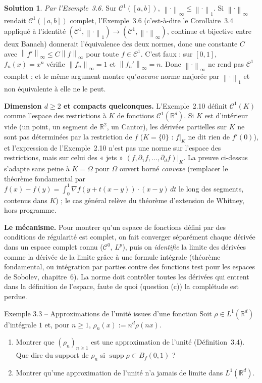 \documentclass[11pt,a4paper]{article}
\newcommand{\R}{\mathbb{R}}
\newcommand{\adh}[1]{\overline{#1}}
\newcommand{\Bf}{B_f}
\newcommand{\norm}[1]{\left\|#1\right\|}
\newcommand{\Cz}{\mathcal{C}^0}
\newcommand{\ie}{c'est-à-dire}
\DeclareMathOperator{\supp}{supp}
\theoremstyle{definition}
\newtheorem*{solution}{Solution}
\begin{document}
\begin{solution}
\emph{Par l'Exemple~3.6.} Sur $\mathcal C^1([a,b])$, $\norm\cdot_\infty\le\norm\cdot_1$. Si $\norm\cdot_\infty$ rendait $\mathcal C^1([a,b])$ complet, l'Exemple~3.6 (\ie{} le Corollaire~3.4 appliqué à l'identité $(\mathcal C^1,\norm\cdot_1)\to(\mathcal C^1,\norm\cdot_\infty)$, continue et bijective entre deux Banach) donnerait l'équivalence des deux normes, donc une constante $C$ avec $\norm{f'}_\infty\le C\norm f_\infty$ pour toute $f\in\mathcal C^1$. C'est faux : sur $[0,1]$, $f_n(x)=x^n$ vérifie $\norm{f_n}_\infty=1$ et $\norm{f_n'}_\infty=n$. Donc $\norm\cdot_\infty$ ne rend pas $\mathcal C^1$ complet ; et le même argument montre qu'\emph{aucune} norme majorée par $\norm\cdot_1$ et non équivalente à elle ne le peut.
\end{solution}

\begin{piege}
\textbf{Dimension $d\ge2$ et compacts quelconques.} L'Exemple~2.10 définit $\mathcal C^1(K)$ comme l'espace des restrictions à $K$ de fonctions $\mathcal C^1(\R^d)$. Si $K$ est d'intérieur vide (un point, un segment de $\R^2$, un Cantor), les dérivées partielles sur $K$ ne sont pas déterminées par la restriction de $f$ ($K=\{0\}$ : $f|_K$ ne dit rien de $f'(0)$), et l'expression de l'Exemple~2.10 n'est pas une norme sur l'espace des restrictions, mais sur celui des « jets » $(f,\partial_1f,\dots,\partial_df)|_K$. La preuve ci-dessus s'adapte sans peine à $K=\adh\Omega$ pour $\Omega$ ouvert borné \emph{convexe} (remplacer le théorème fondamental par $f(x)-f(y)=\int_0^1\nabla f(y+t(x-y))\cdot(x-y)\,dt$ le long des segments, contenus dans $K$) ; le cas général relève du théorème d'extension de Whitney, hors programme.
\end{piege}

\begin{pointcle}
\textbf{Le mécanisme.} Pour montrer qu'un espace de fonctions défini par des conditions de régularité est complet, on fait converger séparément chaque dérivée dans un espace complet connu ($\Cz$, $L^p$), puis on \emph{identifie} la limite des dérivées comme la dérivée de la limite grâce à une formule intégrale (théorème fondamental, ou intégration par parties contre des fonctions test pour les espaces de Sobolev, chapitre~6). La norme doit contrôler toutes les dérivées qui entrent dans la définition de l'espace, faute de quoi (question (c)) la complétude est perdue.
\end{pointcle}

\begin{exo}{Exemple 3.3 -- Approximations de l'unité issues d'une fonction}
Soit $\rho\in L^1(\R^d)$ d'intégrale $1$ et, pour $n\ge1$, $\rho_n(x):=n^d\rho(nx)$.
\begin{enumerate}[label=(\alph*)]
  \item Montrer que $(\rho_n)_{n\ge1}$ est une approximation de l'unité (Définition~3.4). Que dire du support de $\rho_n$ si $\supp\rho\subset\Bf(0,1)$ ?
  \item Montrer qu'une approximation de l'unité n'a jamais de limite dans $L^1(\R^d)$.
\end{enumerate}
\end{exo}
\end{document}
